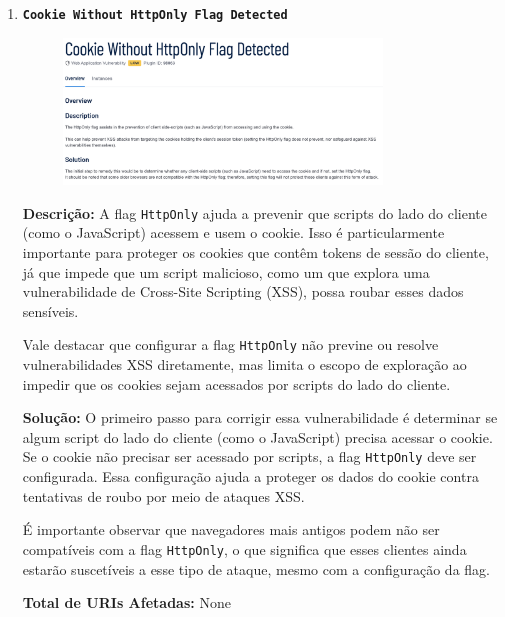 \documentclass[a4paper,12pt]{article}
\begin{document}
\begin{enumerate}
\item \textbf{\texttt{Cookie Without HttpOnly Flag Detected}}

                        \begin{figure}[h!]
                        \centering
                        \includegraphics[width=0.8\textwidth]{assets/images-was/Vulnerabilidades em Cookies e Segurança de Sessão/Cookie Without HttpOnly Flag Detected.png}
                        \end{figure}
                        \FloatBarrier
                        \textbf{Descrição:} A flag \texttt{HttpOnly} ajuda a prevenir que scripts do lado do cliente (como o JavaScript) acessem e usem o cookie. Isso é particularmente importante para proteger os cookies que contêm tokens de sessão do cliente, já que impede que um script malicioso, como um que explora uma vulnerabilidade de Cross-Site Scripting (XSS), possa roubar esses dados sensíveis.

Vale destacar que configurar a flag \texttt{HttpOnly} não previne ou resolve vulnerabilidades XSS diretamente, mas limita o escopo de exploração ao impedir que os cookies sejam acessados por scripts do lado do cliente.

\textbf{Solução:} O primeiro passo para corrigir essa vulnerabilidade é determinar se algum script do lado do cliente (como o JavaScript) precisa acessar o cookie. Se o cookie não precisar ser acessado por scripts, a flag \texttt{HttpOnly} deve ser configurada. Essa configuração ajuda a proteger os dados do cookie contra tentativas de roubo por meio de ataques XSS.

É importante observar que navegadores mais antigos podem não ser compatíveis com a flag \texttt{HttpOnly}, o que significa que esses clientes ainda estarão suscetíveis a esse tipo de ataque, mesmo com a configuração da flag.

\textbf{Total de URIs Afetadas:} None


\end{enumerate}
\end{document}
